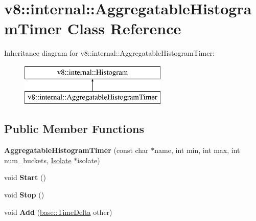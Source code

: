 \hypertarget{classv8_1_1internal_1_1_aggregatable_histogram_timer}{}\section{v8\+:\+:internal\+:\+:Aggregatable\+Histogram\+Timer Class Reference}
\label{classv8_1_1internal_1_1_aggregatable_histogram_timer}
Inheritance diagram for v8\+:\+:internal\+:\+:Aggregatable\+Histogram\+Timer\+:\begin{figure}[H]
\begin{center}
\leavevmode
\includegraphics[height=2.000000cm]{classv8_1_1internal_1_1_aggregatable_histogram_timer}
\end{center}
\end{figure}
\subsection*{Public Member Functions}
\begin{DoxyCompactItemize}
\item 
{\bfseries Aggregatable\+Histogram\+Timer} (const char $\ast$name, int min, int max, int num\+\_\+buckets, \hyperlink{classv8_1_1internal_1_1_isolate}{Isolate} $\ast$isolate)\hypertarget{classv8_1_1internal_1_1_aggregatable_histogram_timer_aafe8f18c2f1b354ab265b82f2fde0aec}{}\label{classv8_1_1internal_1_1_aggregatable_histogram_timer_aafe8f18c2f1b354ab265b82f2fde0aec}

\item 
void {\bfseries Start} ()\hypertarget{classv8_1_1internal_1_1_aggregatable_histogram_timer_a90f85567bb20dba01c8d4e69578db899}{}\label{classv8_1_1internal_1_1_aggregatable_histogram_timer_a90f85567bb20dba01c8d4e69578db899}

\item 
void {\bfseries Stop} ()\hypertarget{classv8_1_1internal_1_1_aggregatable_histogram_timer_ada969f70c76ed1eace83ea0491d7af5e}{}\label{classv8_1_1internal_1_1_aggregatable_histogram_timer_ada969f70c76ed1eace83ea0491d7af5e}

\item 
void {\bfseries Add} (\hyperlink{classv8_1_1base_1_1_time_delta}{base\+::\+Time\+Delta} other)\hypertarget{classv8_1_1internal_1_1_aggregatable_histogram_timer_ad56ff543a2b2816fe290fdc2d259c844}{}\label{classv8_1_1internal_1_1_aggregatable_histogram_timer_ad56ff543a2b2816fe290fdc2d259c844}

\end{DoxyCompactItemize}
